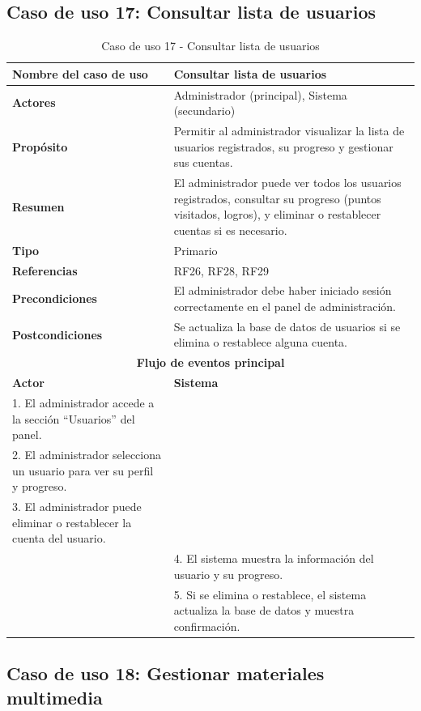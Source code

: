 \clearpage
\subsection{Caso de uso 17: Consultar lista de usuarios}

\begin{table}[H]
\centering
\caption{Caso de uso 17 - Consultar lista de usuarios}
\begin{tabular}{|p{4.5cm}|p{10.5cm}|}
\hline
\textbf{Nombre del caso de uso} & Consultar lista de usuarios \\
\hline
\textbf{Actores} & Administrador (principal), Sistema (secundario) \\
\hline
\textbf{Propósito} & Permitir al administrador visualizar la lista de usuarios registrados, su progreso y gestionar sus cuentas. \\
\hline
\textbf{Resumen} & El administrador puede ver todos los usuarios registrados, consultar su progreso (puntos visitados, logros), y eliminar o restablecer cuentas si es necesario. \\
\hline
\textbf{Tipo} & Primario \\
\hline
\textbf{Referencias} & RF26, RF28, RF29 \\
\hline
\textbf{Precondiciones} & El administrador debe haber iniciado sesión correctamente en el panel de administración. \\
\hline
\textbf{Postcondiciones} & Se actualiza la base de datos de usuarios si se elimina o restablece alguna cuenta. \\
\hline
\multicolumn{2}{|c|}{\textbf{Flujo de eventos principal}} \\
\hline
\textbf{Actor} & \textbf{Sistema} \\
\hline
1. El administrador accede a la sección “Usuarios” del panel. & \\
\hline
2. El administrador selecciona un usuario para ver su perfil y progreso. & \\
\hline
3. El administrador puede eliminar o restablecer la cuenta del usuario. & \\
\hline
& 4. El sistema muestra la información del usuario y su progreso. \\
\hline
& 5. Si se elimina o restablece, el sistema actualiza la base de datos y muestra confirmación. \\
\hline
\end{tabular}
\end{table}

\clearpage
\subsection{Caso de uso 18: Gestionar materiales multimedia}

